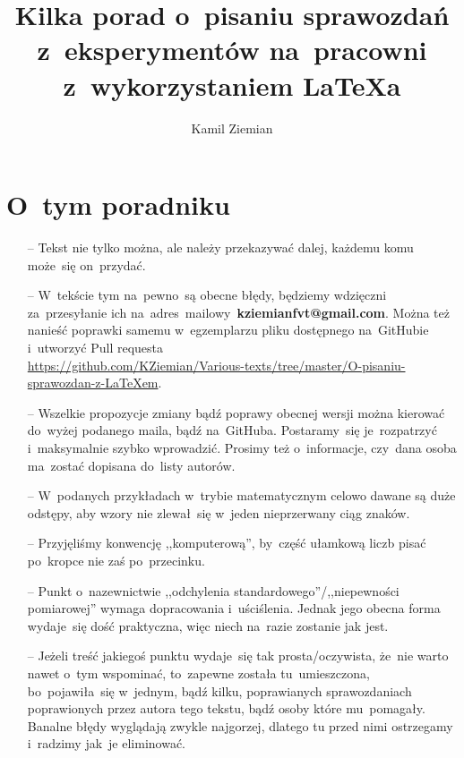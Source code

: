 \documentclass[a4paper,11pt]{article}
\title{Kilka porad o~pisaniu sprawozdań z~eksperymentów na~pracowni
  z~wykorzystaniem \LaTeX a}
\author{Kamil Ziemian}
\newcommand{\tb}{\textbf}
\begin{document}


\maketitle



\section*{O~tym poradniku}
\label{sec:otym}


\begin{itemize}
\item[--] Tekst nie tylko można, ale należy przekazywać dalej, każdemu
  komu może~się on~przydać.

\item[--] W~tekście tym na~pewno~są obecne błędy, będziemy wdzięczni
  za~przesyłanie ich na~adres~mailowy~\tb{kziemianfvt@gmail.com}.
  Można też nanieść poprawki samemu w~egzemplarzu pliku dostępnego
  na~GitHubie i~utworzyć Pull requesta \\
  \href{https://github.com/KZiemian/Various-texts/tree/master/O-pisaniu-sprawozdan-z-LaTeXem}{https://github.com/KZiemian/Various-texts/tree/master/O-pisaniu-sprawozdan-z-LaTeXem}.

\item[--] Wszelkie propozycje zmiany bądź poprawy obecnej wersji można
  kierować do~wyżej podanego maila, bądź na~GitHuba. Postaramy~się
  je~rozpatrzyć i~maksymalnie szybko wprowadzić. Prosimy też
  o~informacje, czy~dana osoba ma~zostać dopisana do~listy autorów.

\item[--] W~podanych przykładach w~trybie matematycznym celowo dawane
  są duże odstępy, aby wzory nie zlewał~się w~jeden nieprzerwany ciąg
  znaków.

\item[--] Przyjęliśmy konwencję ,,komputerową'', by~część ułamkową
  liczb pisać po~kropce nie zaś po~przecinku.

\item[--] Punkt o~nazewnictwie ,,odchylenia
  standardowego''/,,niepewności pomiarowej'' wymaga dopracowania
  i~uściślenia. Jednak jego obecna forma wydaje~się dość praktyczna,
  więc niech na~razie zostanie jak jest.

\item[--] Jeżeli treść jakiegoś punktu wydaje~się tak
  prosta/oczywista, że~nie warto nawet o~tym wspominać, to~zapewne
  została tu~umieszczona, bo~pojawiła~się w~jednym, bądź kilku,
  poprawianych sprawozdaniach poprawionych przez autora tego tekstu,
  bądź osoby które mu~pomagały. Banalne błędy wyglądają zwykle
  najgorzej, dlatego tu przed nimi ostrzegamy i~radzimy jak~je
  eliminować.


\end{itemize}
\end{document}
